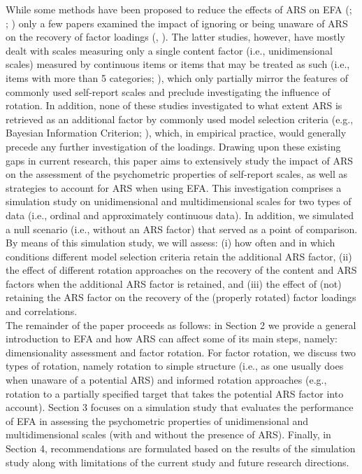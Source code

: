 \documentclass[a4paper,man,natbib]{apa6}
\begin{document}
\begin{linenumbers}
While some methods have been proposed to reduce the effects of ARS on EFA (\citealp{ferrando2003unrestricted}; \citealp{lorenzo2006acquiescent}; \citealp{ferrando2016assessing}) only a few papers examined the impact of ignoring or being unaware of ARS on the recovery of factor loadings (\citealp{ferrando2010acquiescence}, \citealp{savalei2014recovering}). %
The latter studies, however, have mostly dealt with scales measuring only a single content factor (i.e., unidimensional scales) measured by continuous items or items that may be treated as such (i.e., items with more than 5 categories; \citealp{rhemtulla2012can}), which only partially mirror the features of commonly used self-report scales and preclude investigating the influence of rotation. In addition, none of these studies investigated to what extent ARS is retrieved as an additional factor by commonly used model selection criteria (e.g., Bayesian Information Criterion; \citealp*{schwarz1978estimating}), which, in empirical practice, would generally precede any further investigation of the loadings. Drawing upon these existing gaps in current research, this paper aims to extensively study the impact of ARS on the assessment of the psychometric properties of self-report scales, as well as strategies to account for ARS when using EFA. This investigation comprises a simulation study on unidimensional and multidimensional scales for two types of data (i.e., ordinal and approximately continuous data). In addition, we simulated a null scenario (i.e., without an ARS factor) that served as a point of comparison. By means of this simulation study, we will assess: (i) how often and in which conditions different model selection criteria retain the additional ARS factor, (ii) the effect of different rotation approaches on the recovery of the content and ARS factors when the additional ARS factor is retained, and (iii) the effect of (not) retaining the ARS factor on the recovery of the (properly rotated) factor loadings and correlations.\\

The remainder of the paper proceeds as follows: in Section 2 we provide a general introduction to EFA and how ARS can affect some of its main steps, namely: dimensionality assessment and factor rotation. For factor rotation, we discuss two types of rotation, namely rotation to simple structure (i.e., as one usually does when unaware of a potential ARS) and informed rotation approaches (e.g., rotation to a partially specified target that takes the potential ARS factor into account). Section 3 focuses on a simulation study that evaluates the performance of EFA in assessing the psychometric properties of unidimensional and multidimensional scales (with and without the presence of ARS). Finally, in Section 4, recommendations are formulated based on the results of the simulation study along with limitations of the current study and future research directions. 


\end{linenumbers}
\end{document}
